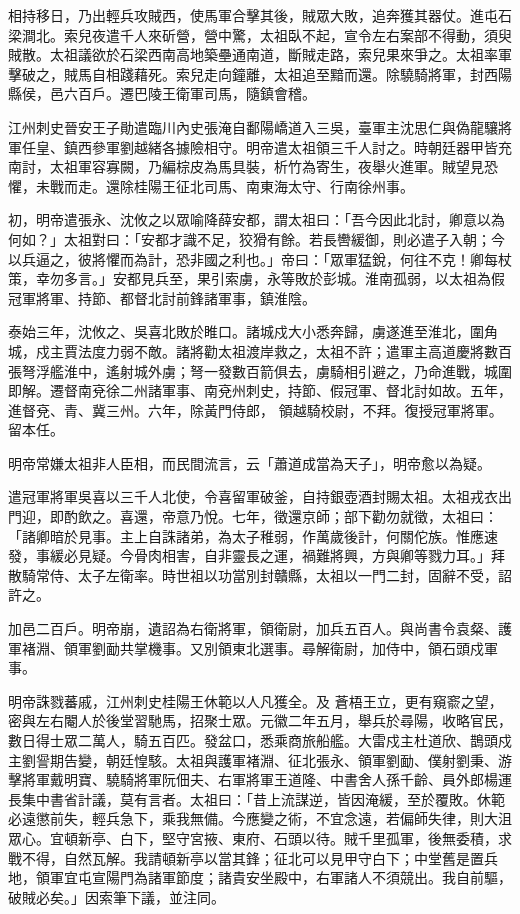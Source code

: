 \begin{pinyinscope}
 相持移日，乃出輕兵攻賊西，使馬軍合擊其後，賊眾大敗，追奔獲其器仗。進屯石梁澗北。索兒夜遣千人來斫營，營中驚，太祖臥不起，宣令左右案部不得動，須臾賊散。太祖議欲於石梁西南高地築壘通南道，斷賊走路，索兒果來爭之。太祖率軍擊破之，賊馬自相踐藉死。索兒走向鐘離，太祖追至黯而還。除驍騎將軍，封西陽縣侯，邑六百戶。遷巴陵王衛軍司馬，隨鎮會稽。



 江州刺史晉安王子勛遣臨川內史張淹自鄱陽嶠道入三吳，臺軍主沈思仁與偽龍驤將軍任皇、鎮西參軍劉越緒各據險相守。明帝遣太祖領三千人討之。時朝廷器甲皆充
 南討，太祖軍容寡闕，乃編棕皮為馬具裝，析竹為寄生，夜舉火進軍。賊望見恐懼，未戰而走。還除桂陽王征北司馬、南東海太守、行南徐州事。



 初，明帝遣張永、沈攸之以眾喻降薛安都，謂太祖曰：「吾今因此北討，卿意以為何如？」太祖對曰：「安都才識不足，狡猾有餘。若長轡緩御，則必遣子入朝；今以兵逼之，彼將懼而為計，恐非國之利也。」帝曰：「眾軍猛銳，何往不克！卿每杖策，幸勿多言。」安都見兵至，果引索虜，永等敗於彭城。淮南孤弱，以太祖為假冠軍將軍、持節、都督北討前鋒諸軍事，鎮淮陰。



 泰始三年，沈攸之、吳喜北敗於睢口。諸城戍大小悉奔歸，虜遂進至淮北，圍角城，戍主賈法度力弱不敵。諸將勸太祖渡岸救之，太祖不許；遣軍主高道慶將數百張弩浮艦淮中，遙射城外虜；弩一發數百箭俱去，虜騎相引避之，乃命進戰，城圍即解。遷督南兗徐二州諸軍事、南兗州刺史，持節、假冠軍、督北討如故。五年，進督兗、青、冀三州。六年，除黃門侍郎，
 領越騎校尉，不拜。復授冠軍將軍。留本任。



 明帝常嫌太祖非人臣相，而民間流言，云「蕭道成當為天子」，明帝愈以為疑。



 遣冠軍將軍吳喜以三千人北使，令喜留軍破釜，自持銀壺酒封賜太祖。太祖戎衣出門迎，即酌飲之。喜還，帝意乃悅。七年，徵還京師；部下勸勿就徵，太祖曰：「諸卿暗於見事。主上自誅諸弟，為太子稚弱，作萬歲後計，何關佗族。惟應速發，事緩必見疑。今骨肉相害，自非靈長之運，禍難將興，方與卿等戮力耳。」拜散騎常侍、太子左衛率。時世祖以功當別封贛縣，太祖以一門二封，固辭不受，詔許之。



 加邑二百戶。明帝崩，遺詔為右衛將軍，領衛尉，加兵五百人。與尚書令袁粲、護軍褚淵、領軍劉勔共掌機事。又別領東北選事。尋解衛尉，加侍中，領石頭戍軍事。



 明帝誅戮蕃戚，江州刺史桂陽王休範以人凡獲全。及
 蒼梧王立，更有窺窬之望，密與左右閹人於後堂習馳馬，招聚士眾。元徽二年五月，舉兵於尋陽，收略官民，數日得士眾二萬人，騎五百匹。發盆口，悉乘商旅船艦。大雷戍主杜道欣、鵲頭戍主劉諐期告變，朝廷惶駭。太祖與護軍褚淵、征北張永、領軍劉勔、僕射劉秉、游擊將軍戴明寶、驍騎將軍阮佃夫、右軍將軍王道隆、中書舍人孫千齡、員外郎楊運長集中書省計議，莫有言者。太祖曰：「昔上流謀逆，皆因淹緩，至於覆敗。休範必遠懲前失，輕兵急下，乘我無備。今應變之術，不宜念遠，若偏師失律，則大沮眾心。宜頓新亭、白下，堅守宮掖、東府、石頭以待。賊千里孤軍，後無委積，求戰不得，自然瓦解。我請頓新亭以當其鋒；征北可以見甲守白下；中堂舊是置兵地，領軍宜屯宣陽門為諸軍節度；諸貴安坐殿中，右軍諸人不須競出。我自前驅，破賊必矣。」因索筆下議，並注同。




\end{pinyinscope}
